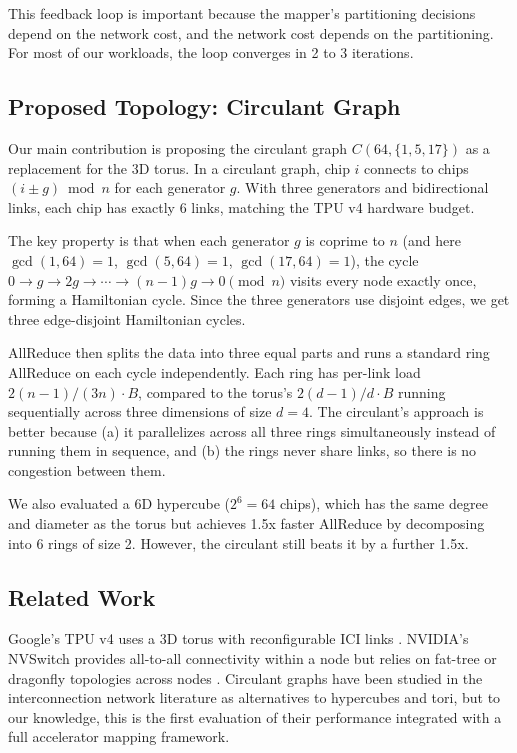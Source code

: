 \documentclass[conference,onecolumn]{IEEEtran}
\begin{document}
This feedback loop is important because the mapper's partitioning decisions depend on the network cost, and the network cost depends on the partitioning. For most of our workloads, the loop converges in 2 to 3 iterations.

\subsection{Proposed Topology: Circulant Graph}

Our main contribution is proposing the circulant graph $C(64, \{1, 5, 17\})$ as a replacement for the 3D torus. In a circulant graph, chip $i$ connects to chips $(i \pm g) \bmod n$ for each generator $g$. With three generators and bidirectional links, each chip has exactly 6 links, matching the TPU v4 hardware budget.

The key property is that when each generator $g$ is coprime to $n$ (and here $\gcd(1,64)=1$, $\gcd(5,64)=1$, $\gcd(17,64)=1$), the cycle $0 \to g \to 2g \to \cdots \to (n{-}1)g \to 0 \pmod{n}$ visits every node exactly once, forming a Hamiltonian cycle. Since the three generators use disjoint edges, we get three edge-disjoint Hamiltonian cycles.

AllReduce then splits the data into three equal parts and runs a standard ring AllReduce on each cycle independently. Each ring has per-link load $2(n{-}1)/(3n) \cdot B$, compared to the torus's $2(d{-}1)/d \cdot B$ running sequentially across three dimensions of size $d{=}4$. The circulant's approach is better because (a) it parallelizes across all three rings simultaneously instead of running them in sequence, and (b) the rings never share links, so there is no congestion between them.

We also evaluated a 6D hypercube ($2^6 = 64$ chips), which has the same degree and diameter as the torus but achieves 1.5x faster AllReduce by decomposing into 6 rings of size 2. However, the circulant still beats it by a further 1.5x.

\subsection{Related Work}

Google's TPU v4 uses a 3D torus with reconfigurable ICI links \cite{tpuv4}. NVIDIA's NVSwitch provides all-to-all connectivity within a node but relies on fat-tree or dragonfly topologies across nodes \cite{nvswitch}. Circulant graphs have been studied in the interconnection network literature \cite{circulant_survey} as alternatives to hypercubes and tori, but to our knowledge, this is the first evaluation of their performance integrated with a full accelerator mapping framework.
\end{document}
